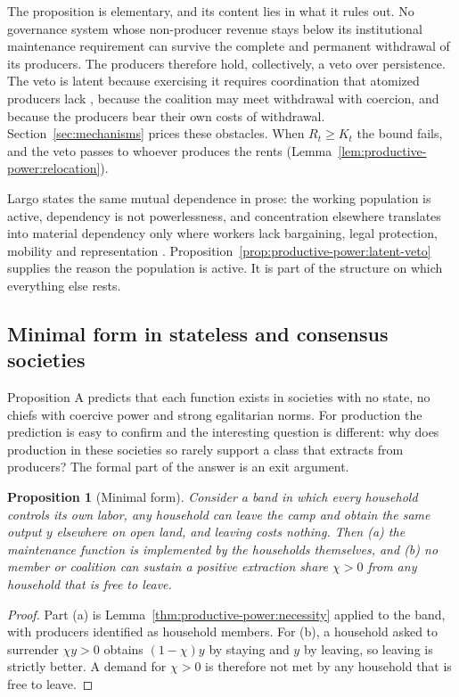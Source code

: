 \documentclass[11pt,letterpaper]{article}
\newtheorem{proposition}[theorem]{Proposition}
\theoremstyle{definition}
\theoremstyle{remark}
\begin{document}
The proposition is elementary, and its content lies in what it rules out. No governance system whose non-producer revenue stays below its institutional maintenance requirement can survive the complete and permanent withdrawal of its producers. The producers therefore hold, collectively, a veto over persistence. The veto is latent because exercising it requires coordination that atomized producers lack \citep{olson1965}, because the coalition may meet withdrawal with coercion, and because the producers bear their own costs of withdrawal. Section~\ref{sec:mechanisms} prices these obstacles. When $R_t\ge K_t$ the bound fails, and the veto passes to whoever produces the rents (Lemma~\ref{lem:productive-power:relocation}).

Largo states the same mutual dependence in prose: the working population is active, dependency is not powerlessness, and concentration elsewhere translates into material dependency only where workers lack bargaining, legal protection, mobility and representation \citep{largo2026hbs}. Proposition~\ref{prop:productive-power:latent-veto} supplies the reason the population is active. It is part of the structure on which everything else rests.

\subsection{Minimal form in stateless and consensus societies}

Proposition A predicts that each function exists in societies with no state, no chiefs with coercive power and strong egalitarian norms. For production the prediction is easy to confirm and the interesting question is different: why does production in these societies so rarely support a class that extracts from producers? The formal part of the answer is an exit argument.

\begin{proposition}[Minimal form]
\label{prop:productive-power:minimal-form}
Consider a band in which every household controls its own labor, any household can leave the camp and obtain the same output $y$ elsewhere on open land, and leaving costs nothing. Then (a) the maintenance function is implemented by the households themselves, and (b) no member or coalition can sustain a positive extraction share $\chi>0$ from any household that is free to leave.
\end{proposition}

\begin{proof}
Part (a) is Lemma~\ref{thm:productive-power:necessity} applied to the band, with producers identified as household members. For (b), a household asked to surrender $\chi y>0$ obtains $(1-\chi)y$ by staying and $y$ by leaving, so leaving is strictly better. A demand for $\chi>0$ is therefore not met by any household that is free to leave.
\end{proof}
\end{document}
